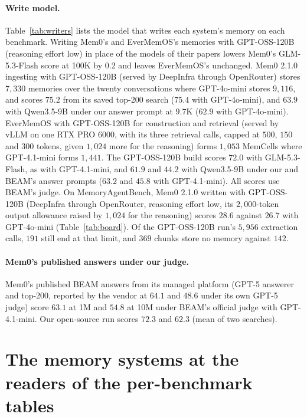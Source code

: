 \documentclass{article}
\begin{document}
\paragraph{Write model.} Table~\ref{tab:writers} lists the model that writes each system's memory on each benchmark. Writing Mem0's and EverMemOS's memories with GPT-OSS-120B (reasoning effort low) in place of the models of their papers lowers Mem0's GLM-5.3-Flash score at 100K by $0.2$ and leaves EverMemOS's unchanged. Mem0 2.1.0 ingesting with GPT-OSS-120B (served by DeepInfra through OpenRouter) stores $7{,}330$ memories over the twenty conversations where GPT-4o-mini stores $9{,}116$, and scores $75.2$ from its saved top-200 search ($75.4$ with GPT-4o-mini), and $63.9$ with Qwen3.5-9B under our answer prompt at $9.7$K ($62.9$ with GPT-4o-mini). EverMemOS with GPT-OSS-120B for construction and retrieval (served by vLLM on one RTX PRO 6000, with its three retrieval calls, capped at $500$, $150$ and $300$ tokens, given $1{,}024$ more for the reasoning) forms $1{,}053$ MemCells where GPT-4.1-mini forms $1{,}441$. The GPT-OSS-120B build scores $72.0$ with GLM-5.3-Flash, as with GPT-4.1-mini, and $61.9$ and $44.2$ with Qwen3.5-9B under our and BEAM's answer prompts ($63.2$ and $45.8$ with GPT-4.1-mini). All scores use BEAM's judge. On MemoryAgentBench, Mem0 2.1.0 written with GPT-OSS-120B (DeepInfra through OpenRouter, reasoning effort low, its $2{,}000$-token output allowance raised by $1{,}024$ for the reasoning) scores $28.6$ against $26.7$ with GPT-4o-mini (Table~\ref{tab:board}). Of the GPT-OSS-120B run's $5{,}956$ extraction calls, $191$ still end at that limit, and $369$ chunks store no memory against $142$.

\paragraph{Mem0's published answers under our judge.} Mem0's published BEAM answers from its managed platform \cite{mem0bench} (GPT-5
answerer and top-200, reported by the vendor at $64.1$ and $48.6$ under its own GPT-5 judge) score $63.1$ at 1M and $54.8$ at 10M
under BEAM's official judge with GPT-4.1-mini. Our open-source run scores $72.3$ and $62.3$ (mean of two searches).



\FloatBarrier
\section{The memory systems at the readers of the per-benchmark tables}\label{app:overviewstd}
\end{document}
